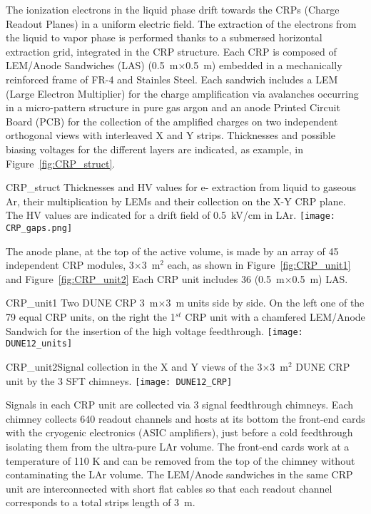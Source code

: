 The ionization electrons in the liquid phase drift towards the CRPs
(Charge Readout Planes) in a uniform electric field. The extraction of
the electrons from the liquid to vapor phase is performed thanks to a
submersed horizontal extraction grid, integrated in the CRP structure.
Each CRP is composed of LEM/Anode Sandwiches (LAS)
(0.5~m$\times$0.5~m) embedded in a mechanically reinforced frame of
FR-4 and Stainles Steel.  Each sandwich includes a LEM (Large Electron
Multiplier) for the charge amplification via avalanches occurring in a
micro-pattern structure in pure gas argon and an anode Printed Circuit
Board (PCB) for the collection of the amplified charges on two
independent orthogonal views with interleaved X and Y strips.
Thicknesses and possible biasing voltages for the different layers are
indicated, as example, in Figure~\ref{fig:CRP_struct}.
\begin{cdrfigure}{CRP_struct}
{Thicknesses and HV values for e- extraction from liquid to gaseous Ar, their 
multiplication by LEMs and their collection on the X-Y CRP plane. The 
HV values are indicated for a drift field of 0.5~kV/cm in LAr.}
\texttt{[image: CRP\_gaps.png]}
\end{cdrfigure}

The anode plane, at the top of the active volume, is made by an array
of 45 independent CRP modules, 3$\times$3~m$^2$ each, as shown in
Figure~\ref{fig:CRP_unit1} and Figure~\ref{fig:CRP_unit2} Each CRP
unit includes 36 (0.5~m$\times$0.5~m) LAS.
\begin{cdrfigure}{CRP_unit1} {Two DUNE CRP 3~m$\times$3~m units side by side. On the left one of the 79 equal 
CRP units, on the right the 1$^{st}$ CRP unit with a chamfered LEM/Anode Sandwich  for the insertion of the high voltage feedthrough.}
\texttt{[image: DUNE12\_units]}
\end{cdrfigure}
\begin{cdrfigure}
{CRP_unit2}{Signal collection in the X and Y views of the  3$\times$3~m$^2$ DUNE CRP unit by the 3 SFT chimneys.}
\texttt{[image: DUNE12\_CRP]}
\end{cdrfigure}

Signals in each CRP unit are collected via 3 signal feedthrough
chimneys. Each chimney collects 640 readout channels and hosts at its
bottom the front-end cards with the cryogenic electronics (ASIC
amplifiers), just before a cold feedthrough isolating them from the
ultra-pure LAr volume. The front-end cards work at a temperature of
110 K and can be removed from the top of the chimney without
contaminating the LAr volume. The LEM/Anode sandwiches in the same CRP
unit are interconnected with short flat cables so that each readout
channel corresponds to a total strips length of 3~m.
  
